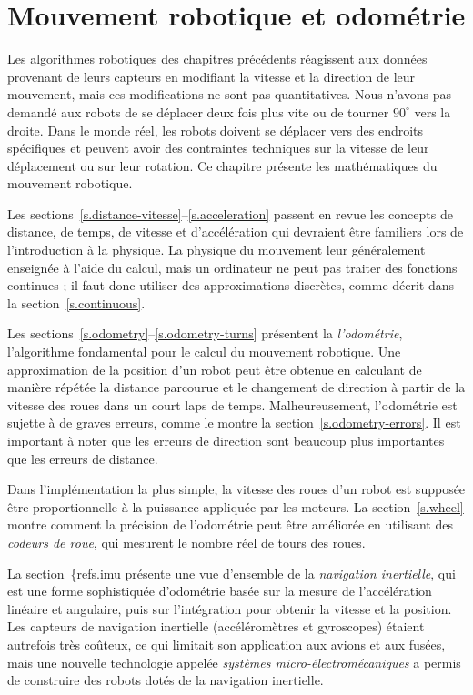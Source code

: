 
\chapter{Mouvement robotique et odométrie}\label{ch.motion}

Les algorithmes robotiques des chapitres précédents réagissent aux données provenant de leurs capteurs en modifiant la vitesse et la direction de leur mouvement, mais ces modifications ne sont pas quantitatives. Nous n'avons pas demandé aux robots de se déplacer deux fois plus vite ou de tourner $90^\circ$ vers la droite. Dans le monde réel, les robots doivent se déplacer vers des endroits spécifiques et peuvent avoir des contraintes techniques sur la vitesse de leur déplacement ou sur leur rotation. Ce chapitre présente les mathématiques du mouvement robotique.

Les sections~\ref{s.distance-vitesse}--\ref{s.acceleration} passent en revue les concepts de distance, de temps, de vitesse et d'accélération qui devraient être familiers lors de l'introduction à la physique. La physique du mouvement leur généralement enseignée à l'aide du calcul, mais un ordinateur ne peut pas traiter des fonctions continues ; il faut donc utiliser des approximations discrètes, comme décrit dans la section~\ref{s.continuous}.

Les sections~\ref{s.odometry}--\ref{s.odometry-turns} présentent la \emph{l'odométrie}, l'algorithme fondamental pour le calcul du mouvement robotique. Une approximation de la position d'un robot peut être obtenue en calculant de manière répétée la distance parcourue et le changement de direction à partir de la vitesse des roues dans un court laps de temps. Malheureusement, l'odométrie est sujette à de graves erreurs, comme le montre la section~\ref{s.odometry-errors}. Il est important à noter que les erreurs de direction sont beaucoup plus importantes que les erreurs de distance.

Dans l'implémentation la plus simple, la vitesse des roues d'un robot est supposée être proportionnelle à la puissance appliquée par les moteurs. La section~\ref{s.wheel} montre comment la précision de l'odométrie peut être améliorée en utilisant des \emph{codeurs de roue}, qui mesurent le nombre réel de tours des roues.

La section~\{ref{s.imu} présente une vue d'ensemble de la \emph{navigation inertielle}, qui est une forme sophistiquée d'odométrie basée sur la mesure de l'accélération linéaire et angulaire, puis sur l'intégration pour obtenir la vitesse et la position. Les capteurs de navigation inertielle (accéléromètres et gyroscopes) étaient autrefois très coûteux, ce qui limitait son application aux avions et aux fusées, mais une nouvelle technologie appelée \emph{systèmes micro-électromécaniques} a permis de construire des robots dotés de la navigation inertielle.

